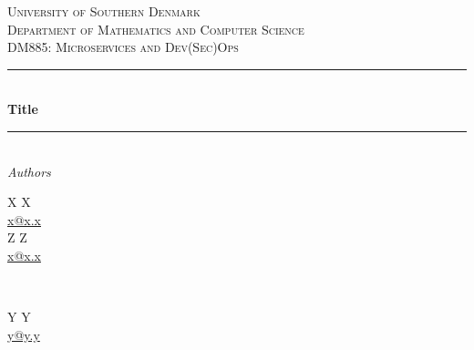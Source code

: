 \documentclass[a4paper,12pt]{article}
\begin{document}
\begin{titlepage}

\newcommand{\HRule}{\rule{\linewidth}{0.5mm}}

\center %


	\textsc{\LARGE University of Southern Denmark}\\[1.5cm]

	\textsc{\Large Department of Mathematics and Computer Science}\\[0.5cm]

	\textsc{\large DM885: Microservices and Dev(Sec)Ops}\\[0.5cm]


	\HRule\\[0.7cm]

	{\huge\bfseries Title}\\[0.4cm] %

	\HRule\\[1.0cm]

	\large
	\textit{Authors}\\ \bigskip
	\begin{minipage}[t]{0.45\textwidth}
	    \begin{center}
		    \normalsize
		    X X\\
		    \href{mailto:x@x.x}{x@x.x}\\ \bigskip
		    Z Z\\
		    \href{mailto:x@x.x}{x@x.x}\\ \bigskip

	   \end{center}
	\end{minipage}
	~
	\begin{minipage}[t]{0.45\textwidth}
	    \begin{center}
		    \normalsize
		    Y Y\\
		    \href{mailto:y@y.y}{y@y.y}\\ \bigskip
		\end{center}
	\end{minipage}
	


\end{titlepage}
\end{document}
